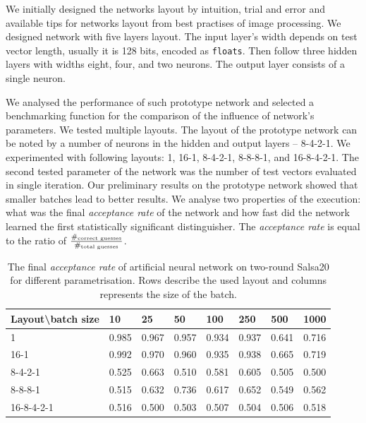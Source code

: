 \documentclass[
  print, %
  Table,   %
  nolof,     %
  nolot,     %
  11pt, %
  oneside  %
]{fithesis3}
\begin{document}
We initially designed the networks layout by intuition, trial and error and available tips for networks layout from best practises of image processing. We designed network with five layers layout. The input layer's width depends on test vector length, usually it is 128 bits, encoded as \texttt{floats}. Then follow three hidden layers with widths eight, four, and two neurons. The output layer consists of a single neuron.

We analysed the performance of such prototype network and selected a benchmarking function for the comparison of the influence of network's parameters. We tested multiple layouts. The layout of the prototype network can be noted by a number of neurons in the hidden and output layers -- 8-4-2-1. We experimented with following layouts: 1, 16-1, 8-4-2-1, 8-8-8-1, and 16-8-4-2-1. The second tested parameter of the network was the number of test vectors evaluated in single iteration. Our preliminary results on the prototype network showed that smaller batches lead to better results. We analyse two properties of the execution: what was the final \textit{acceptance rate} of the network and how fast did the network learned the first statistically significant distinguisher. The \textit{acceptance rate} is equal to the ratio of $\frac{\#_{\textnormal{correct guesses}}}{\#_{\textnormal{total guesses}}}$.

\begin{table}[t]
\centering
\begin{tabular}{l|l l l l l l l}
Layout\textbackslash{}batch size & 10 & 25 & 50 & 100 & 250 & 500 & 1000\\ \hline{}
1          & 0.985 & 0.967 & 0.957 & 0.934 & 0.937 & 0.641 & 0.716 \\
16-1       & 0.992 & 0.970 & 0.960 & 0.935 & 0.938 & 0.665 & 0.719 \\
8-4-2-1    & 0.525 & 0.663 & 0.510 & 0.581 & 0.605 & 0.505 & 0.500 \\
8-8-8-1    & 0.515 & 0.632 & 0.736 & 0.617 & 0.652 & 0.549 & 0.562 \\
16-8-4-2-1 & 0.516 & 0.500 & 0.503 & 0.507 & 0.504 & 0.506 & 0.518  
\end{tabular}
\caption{The final \textit{acceptance rate} of artificial neural network on two-round Salsa20 for different parametrisation. Rows describe the used layout and columns represents the size of the batch.}
\label{table:res-ann-acc}
\end{table}
\end{document}
